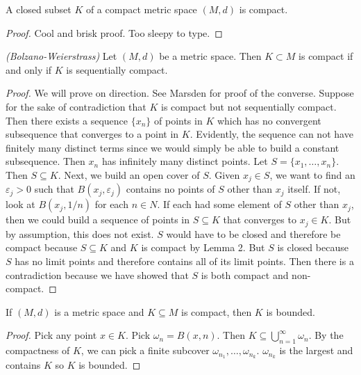 \documentclass[11pt]{article}
\theoremstyle{definition}
\begin{document}
\lem A closed subset $K$ of a compact metric space $(M,d)$ is compact.
\begin{proof}
    Cool and brisk proof. Too sleepy to type.
\end{proof}

\prop \textit{(Bolzano-Weierstrass)} Let $(M,d)$ be a metric space. Then $K\subset M$ is compact if and only if $K$ is sequentially compact.

\begin{proof}
    We will prove on direction. See Marsden for proof of the converse. Suppose for the sake of contradiction that $K$ is compact but not sequentially compact. Then there exists a sequence $\{x_n\}$ of points in $K$ which has no convergent subsequence that converges to a point in $K$. Evidently, the sequence can not have finitely many distinct terms since we would simply be able to build a constant subsequence. Then $x_n$ has infinitely many distinct points. Let $S=\{x_1,\dots, x_n\}$. Then $S\subseteq K$. Next, we build an open cover of $S$. Given $x_j\in S$, we want to find an $\varepsilon_j>0$ such that $B(x_j, \varepsilon_j)$ contains no points of $S$ other than $x_j$ itself. If not, look at $B(x_j,1/n)$ for each $n\in N$. If each had some element of $S$ other than $x_j$, then we could build a sequence of points in $S\subseteq K$ that converges to $x_j\in K$. But by assumption, this does not exist. $S$ would have to be closed and therefore be compact because $S\subseteq K$ and $K$ is compact by Lemma 2. But $S$ is closed because $S$ has no limit points and therefore contains all of its limit points. Then there is a contradiction because we have showed that $S$ is both compact and non-compact.
\end{proof}

\lem If $(M,d)$ is a metric space and $K\subseteq M$ is compact, then $K$ is bounded.
\begin{proof}
    Pick any point $x\in K$. Pick $\omega_n=B(x,n)$. Then $K\subseteq \bigcup_{n=1}^\infty \omega_n$. By the compactness of $K$, we can pick a finite subcover $\omega_{n_1},\dots,\omega_{n_k}$. $\omega_{n_k}$ is the largest and contains $K$ so $K$ is bounded.
\end{proof}
\end{document}
